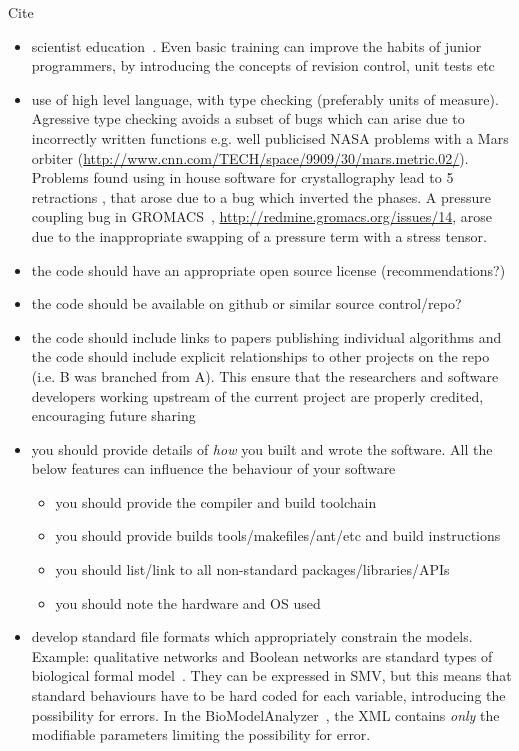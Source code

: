 \documentclass[conference]{IEEEtran}
\begin{document}
Cite~\cite{collberg-et-al:2014}

\begin{itemize}
\item scientist education~\cite{Wilson2014}. Even basic training can improve the habits of junior programmers, by introducing the concepts of revision control, unit tests etc
\item use of high level language, with type checking (preferably units of measure). Agressive type checking avoids a subset of bugs which can arise due to incorrectly written functions e.g. well publicised NASA problems with a Mars orbiter (\url{http://www.cnn.com/TECH/space/9909/30/mars.metric.02/}). Problems found using in house software for crystallography lead to 5 retractions \cite{Miller2006}, that arose due to a bug which inverted the phases. A pressure coupling bug in GROMACS~\cite{Hess2008}, \url{http://redmine.gromacs.org/issues/14}, arose due to the inappropriate swapping of a pressure term with a stress tensor.
\item the code should have an appropriate open source license (recommendations?)
\item the code should be available on github or similar source control/repo?
\item the code should include links to papers publishing individual algorithms and the code should include explicit relationships to other projects on the repo (i.e. B was branched from A). This ensure that the researchers and software developers working upstream of the current project are properly credited, encouraging future sharing
\item you should provide details of \emph{how} you built and wrote the software. All the below features can influence the behaviour of your software
\begin{itemize}
\item you should provide the compiler and build toolchain
\item you should provide builds tools/makefiles/ant/etc and build instructions
\item you should list/link to all non-standard packages/libraries/APIs
\item you should note the hardware and OS used
\end{itemize}
\item develop standard file formats which appropriately constrain the models. Example: qualitative networks and Boolean networks are standard types of biological formal model~\cite{Kauffman1969,Schaub2007}. They can be expressed in SMV, but this means that standard behaviours have to be hard coded for each variable, introducing the possibility for errors. In the BioModelAnalyzer~\cite{Benque2012}, the XML contains \emph{only} the modifiable parameters limiting the possibility for error.

\end{itemize}
\end{document}
